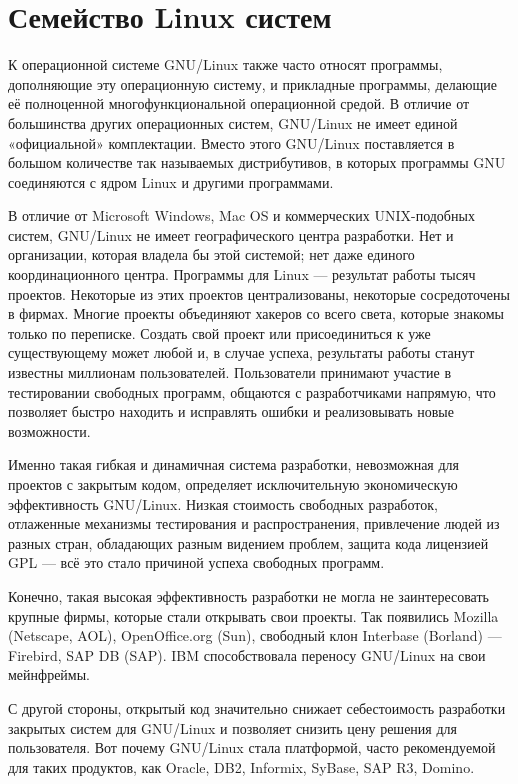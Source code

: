 \section{Семейство Linux систем}

К операционной системе GNU/Linux также часто относят программы, дополняющие эту операционную систему, и прикладные программы, делающие её полноценной многофункциональной операционной средой. В отличие от большинства других операционных систем, GNU/Linux не имеет единой «официальной» комплектации. Вместо этого GNU/Linux поставляется в большом количестве так называемых дистрибутивов, в которых программы GNU соединяются с ядром Linux и другими программами.

В отличие от Microsoft Windows, Mac OS и коммерческих UNIX-подобных систем, GNU/Linux не имеет географического центра разработки. Нет и организации, которая владела бы этой системой; нет даже единого координационного центра. Программы для Linux — результат работы тысяч проектов. Некоторые из этих проектов централизованы, некоторые сосредоточены в фирмах. Многие проекты объединяют хакеров со всего света, которые знакомы только по переписке. Создать свой проект или присоединиться к уже существующему может любой и, в случае успеха, результаты работы станут известны миллионам пользователей. Пользователи принимают участие в тестировании свободных программ, общаются с разработчиками напрямую, что позволяет быстро находить и исправлять ошибки и реализовывать новые возможности.

Именно такая гибкая и динамичная система разработки, невозможная для проектов с закрытым кодом, определяет исключительную экономическую эффективность GNU/Linux. Низкая стоимость свободных разработок, отлаженные механизмы тестирования и распространения, привлечение людей из разных стран, обладающих разным видением проблем, защита кода лицензией GPL — всё это стало причиной успеха свободных программ.

Конечно, такая высокая эффективность разработки не могла не заинтересовать крупные фирмы, которые стали открывать свои проекты. Так появились Mozilla (Netscape, AOL), OpenOffice.org (Sun), свободный клон Interbase (Borland) — Firebird, SAP DB (SAP). IBM способствовала переносу GNU/Linux на свои мейнфреймы.

С другой стороны, открытый код значительно снижает себестоимость разработки закрытых систем для GNU/Linux и позволяет снизить цену решения для пользователя. Вот почему GNU/Linux стала платформой, часто рекомендуемой для таких продуктов, как Oracle, DB2, Informix, SyBase, SAP R3, Domino.

